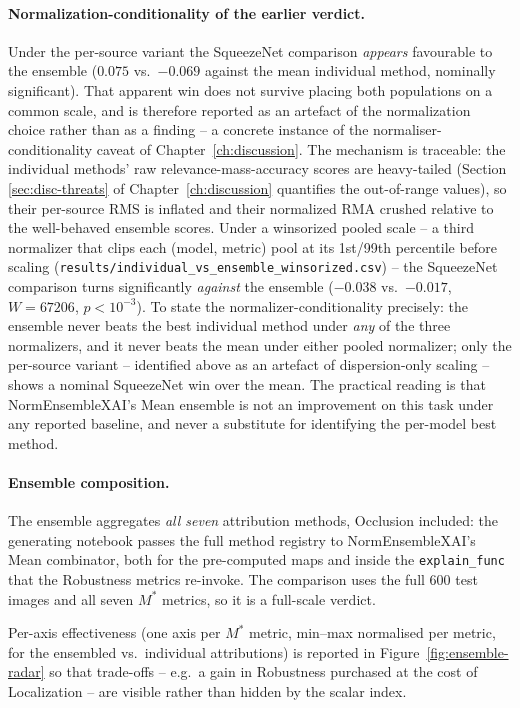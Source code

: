 \paragraph{Normalization-conditionality of the earlier verdict.} Under the
per-source variant the SqueezeNet comparison \emph{appears} favourable to
the ensemble ($0.075$ vs.\ $-0.069$ against the mean individual method,
nominally significant). That apparent win does not survive placing both
populations on a common scale, and is therefore reported as an artefact of
the normalization choice rather than as a finding -- a concrete instance of
the normaliser-conditionality caveat of Chapter~\ref{ch:discussion}. The
mechanism is traceable: the individual methods' raw
relevance-mass-accuracy scores are heavy-tailed (Section
\ref{sec:disc-threats} of Chapter~\ref{ch:discussion} quantifies the
out-of-range values), so their per-source RMS is inflated and their
normalized RMA crushed relative to the well-behaved ensemble scores. Under
a winsorized pooled scale -- a third normalizer that clips each (model,
metric) pool at its 1st/99th percentile before scaling
(\texttt{results/individual\_vs\_ensemble\_winsorized.csv}) -- the
SqueezeNet comparison turns significantly \emph{against} the ensemble
($-0.038$ vs.\ $-0.017$, $W = 67206$, $p < 10^{-3}$). To state the
normalizer-conditionality precisely: the ensemble never beats the best
individual method under \emph{any} of the three normalizers, and it never
beats the mean under either pooled normalizer; only the per-source
variant -- identified above as an artefact of dispersion-only
scaling -- shows a nominal SqueezeNet win over the mean. The
practical reading is that NormEnsembleXAI's Mean ensemble is not an
improvement on this task under any reported baseline, and never a
substitute for identifying the per-model best method.

\paragraph{Ensemble composition.}
The ensemble aggregates \emph{all seven} attribution methods, Occlusion
included: the generating notebook passes the full method registry to
NormEnsembleXAI's Mean combinator, both for the pre-computed maps and
inside the \texttt{explain\_func} that the Robustness metrics re-invoke.
The comparison uses the full 600 test
images and all seven $M^{*}$ metrics, so it is a full-scale verdict.

Per-axis effectiveness (one axis per $M^{*}$ metric, min--max normalised
per metric, for the
ensembled vs.\ individual attributions) is reported in
Figure~\ref{fig:ensemble-radar} so that trade-offs -- e.g.\ a gain in Robustness
purchased at the cost of Localization -- are visible rather than hidden by the
scalar index.

